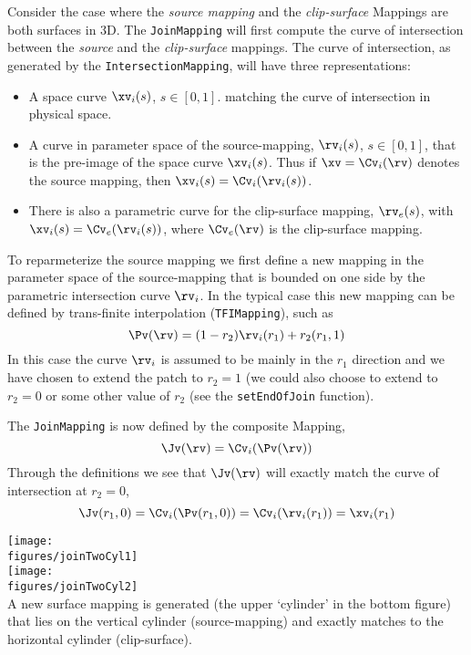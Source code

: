 Consider the case where the {\sl source mapping} and the {\sl clip-surface}
Mappings are both surfaces in 3D.
The {\tt JoinMapping} will first compute the curve of intersection between the {\sl source}
and the {\sl clip-surface} mappings.  
The curve of intersection, as generated by the {\tt IntersectionMapping},
will have three representations:
\begin{itemize}
   \item A space curve $\xv_i(s)$, $s\in[0,1]$. matching the curve of intersection in physical space.
   \item A curve in parameter space of the source-mapping, $\rv_i(s)$, $s\in[0,1]$, that is
       the pre-image of the space curve $\xv_i(s)$. Thus if $\xv=\Cv_i(\rv)$ denotes the source 
       mapping,  then $\xv_i(s)=\Cv_i(\rv_i(s))$.
   \item There is also a parametric curve for the clip-surface mapping, $\rv_e(s)$, with $\xv_i(s)=\Cv_e(\rv_i(s))$,
      where $\Cv_e(\rv)$ is the clip-surface mapping.
\end{itemize}
To reparmeterize the source mapping we first define a new mapping in the parameter space of the
source-mapping that is bounded on one side by the parametric intersection curve $\rv_i$. In the typical case this
new mapping can be defined by trans-finite interpolation ({\tt TFIMapping}), such as
\[
     \Pv(\rv) = (1-r_2) \rv_i(r_1) + r_2 (r_1,1)  
\]
In this case the curve $\rv_i$ is assumed to be mainly in the $r_1$ direction and we have chosen to extend the
patch to $r_2=1$ (we could also choose to extend to $r_2=0$ or some other value of $r_2$ (see the {\tt setEndOfJoin}
function).

The {\tt JoinMapping} is now defined by the composite Mapping,
\[
  \Jv(\rv)=\Cv_i(\Pv(\rv))
\]
Through the definitions we see that $\Jv(\rv)$ will exactly match the curve of intersection at $r_2=0$,
\[
   \Jv(r_1,0)=\Cv_i(\Pv(r_1,0)) = \Cv_i(\rv_i(r_1)) = \xv_i(r_1)
\]

\noindent
\begin{minipage}{.4\linewidth}
{\footnotesize
{}
}
\end{minipage}\hfill
\begin{minipage}{.6\linewidth}
  \begin{center}
    \texttt{[image: \\figures/joinTwoCyl1]}\\
    \texttt{[image: \\figures/joinTwoCyl2]}\\
  {A new surface mapping is generated (the upper `cylinder' in the bottom figure)
   that lies on the vertical cylinder (source-mapping) 
    and exactly matches to the horizontal cylinder (clip-surface).}
  \end{center}
\end{minipage}

